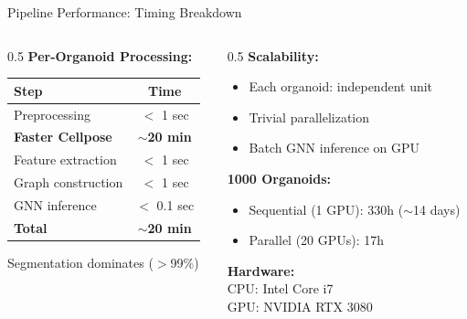 \documentclass[aspectratio=169]{beamer}
\begin{document}
\begin{frame}{Pipeline Performance: Timing Breakdown}
    \begin{columns}
        \begin{column}{0.5\textwidth}
            \textbf{Per-Organoid Processing:}
            \begin{table}
                \footnotesize
                \begin{tabular}{lc}
                    \toprule
                    \textbf{Step} & \textbf{Time} \\
                    \midrule
                    Preprocessing & $<$ 1 sec \\
                    \textbf{Faster Cellpose} & \textbf{$\sim$20 min} \\
                    Feature extraction & $<$ 1 sec \\
                    Graph construction & $<$ 1 sec \\
                    GNN inference & $<$ 0.1 sec \\
                    \midrule
                    \textbf{Total} & \textbf{$\sim$20 min} \\
                    \bottomrule
                \end{tabular}
            \end{table}
            
            {\footnotesize Segmentation dominates ($>$99\%)}
        \end{column}
        \begin{column}{0.5\textwidth}
            \textbf{Scalability:}
            \begin{itemize}
                \item Each organoid: independent unit
                \item Trivial parallelization
                \item Batch GNN inference on GPU
            \end{itemize}
            
            \vspace{0.5em}
            \textbf{1000 Organoids:}
            \begin{itemize}
                \item Sequential (1 GPU): 330h ($\sim$14 days)
                \item Parallel (20 GPUs): 17h
            \end{itemize}
            
            \vspace{0.5em}
            \textbf{Hardware:}\\
            CPU: Intel Core i7\\
            GPU: NVIDIA RTX 3080
        \end{column}
    \end{columns}
\end{frame}
\end{document}
